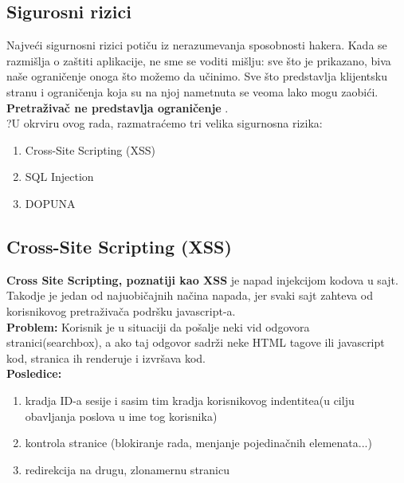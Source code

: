 \documentclass[a4paper]{article}
\begin{document}
\subsection{Sigurosni rizici}
Najve\'{c}i sigurnosni rizici poti\v{c}u iz nerazumevanja sposobnosti hakera. Kada se razmi\v{s}lja o za\v{s}titi aplikacije, ne sme se voditi mi\v{s}lju: sve \v{s}to je prikazano, biva na\v{s}e ograni\v{c}enje onoga \v{s}to mo\v{z}emo da u\v{c}inimo. Sve \v{s}to predstavlja klijentsku stranu i ograni\v{c}enja koja su na njoj nametnuta se veoma lako mogu zaobi\'{c}i.
\textbf{Pretra\v{z}iva\v{c} ne predstavlja ograni\v{c}enje }.\\
?U okrviru ovog rada, razmatra\'{c}emo tri velika sigurnosna rizika:
\begin{enumerate}
	\item Cross-Site Scripting (XSS)
	\item SQL Injection
	\item DOPUNA
\end{enumerate}
\newpage
\subsection{Cross-Site Scripting (XSS)}
\textbf{Cross Site Scripting, poznatiji kao XSS} je napad injekcijom kodova u sajt. Takodje je jedan od najuobi\v{c}ajnih na\v{c}ina napada, jer svaki sajt zahteva od korisnikovog pretra\v{z}iva\v{c}a podr\v{s}ku javascript-a.\\
\textbf{Problem:} Korisnik je u situaciji da po\v{s}alje neki vid odgovora stranici(searchbox), a ako taj odgovor sadr\v{z}i neke HTML tagove ili javascript kod, stranica ih renderuje i izvr\v{s}ava kod.\\
\textbf{Posledice:} \begin{enumerate}
	\item kradja ID-a sesije i sasim tim kradja korisnikovog indentitea(u cilju obavljanja poslova u ime tog korisnika)
	\item kontrola stranice (blokiranje rada, menjanje pojedina\v{c}nih elemenata...)
	\item redirekcija na drugu, zlonamernu stranicu
\end{enumerate}
\end{document}
